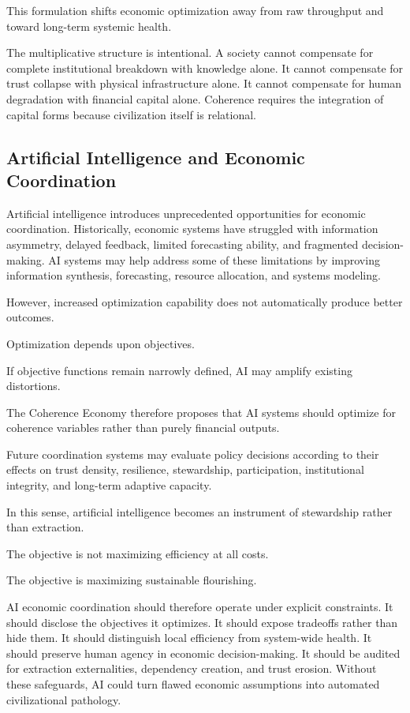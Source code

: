 \documentclass[12pt]{article}
\begin{document}
This formulation shifts economic optimization away from raw throughput and toward long-term systemic health.

The multiplicative structure is intentional. A society cannot compensate for complete institutional breakdown with knowledge alone. It cannot compensate for trust collapse with physical infrastructure alone. It cannot compensate for human degradation with financial capital alone. Coherence requires the integration of capital forms because civilization itself is relational.

\subsection{Artificial Intelligence and Economic Coordination}

Artificial intelligence introduces unprecedented opportunities for economic coordination. Historically, economic systems have struggled with information asymmetry, delayed feedback, limited forecasting ability, and fragmented decision-making. AI systems may help address some of these limitations by improving information synthesis, forecasting, resource allocation, and systems modeling.

However, increased optimization capability does not automatically produce better outcomes.

Optimization depends upon objectives.

If objective functions remain narrowly defined, AI may amplify existing distortions.

The Coherence Economy therefore proposes that AI systems should optimize for coherence variables rather than purely financial outputs.

Future coordination systems may evaluate policy decisions according to their effects on trust density, resilience, stewardship, participation, institutional integrity, and long-term adaptive capacity.

In this sense, artificial intelligence becomes an instrument of stewardship rather than extraction.

The objective is not maximizing efficiency at all costs.

The objective is maximizing sustainable flourishing.

AI economic coordination should therefore operate under explicit constraints. It should disclose the objectives it optimizes. It should expose tradeoffs rather than hide them. It should distinguish local efficiency from system-wide health. It should preserve human agency in economic decision-making. It should be audited for extraction externalities, dependency creation, and trust erosion. Without these safeguards, AI could turn flawed economic assumptions into automated civilizational pathology.
\end{document}
